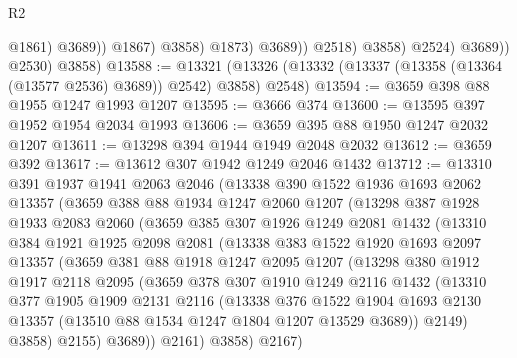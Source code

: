 \begin{lexlean}{R2}
\begin{coremodule}
                                  @1861)
                                @3689))
                            @1867)
                          @3858)
                        @1873)
                      @3689))
                  @2518)
                @3858)
              @2524)
            @3689))
        @2530)
      @3858)
@13588 := @13321 (@13326 (@13332 (@13337 (@13358 (@13364 (@13577 @2536) @3689)) @2542) @3858) @2548)
@13594 := @3659 @398 @88 @1955 @1247 @1993 @1207
@13595 := @3666 @374
@13600 := @13595 @397 @1952 @1954 @2034 @1993
@13606 := @3659 @395 @88 @1950 @1247 @2032 @1207
@13611 := @13298 @394 @1944 @1949 @2048 @2032
@13612 := @3659 @392
@13617 := @13612 @307 @1942 @1249 @2046 @1432
@13712 := @13310
    @391
    @1937
    @1941
    @2063
    @2046
    (@13338
      @390
      @1522
      @1936
      @1693
      @2062
      @13357
      (@3659
        @388
        @88
        @1934
        @1247
        @2060
        @1207
        (@13298
          @387
          @1928
          @1933
          @2083
          @2060
          (@3659
            @385
            @307
            @1926
            @1249
            @2081
            @1432
            (@13310
              @384
              @1921
              @1925
              @2098
              @2081
              (@13338
                @383
                @1522
                @1920
                @1693
                @2097
                @13357
                (@3659
                  @381
                  @88
                  @1918
                  @1247
                  @2095
                  @1207
                  (@13298
                    @380
                    @1912
                    @1917
                    @2118
                    @2095
                    (@3659
                      @378
                      @307
                      @1910
                      @1249
                      @2116
                      @1432
                      (@13310
                        @377
                        @1905
                        @1909
                        @2131
                        @2116
                        (@13338
                          @376
                          @1522
                          @1904
                          @1693
                          @2130
                          @13357
                          (@13510 @88 @1534 @1247 @1804 @1207 @13529 @3689))
                        @2149)
                      @3858)
                    @2155)
                  @3689))
              @2161)
            @3858)
          @2167)

\end{coremodule}
\end{lexlean}
